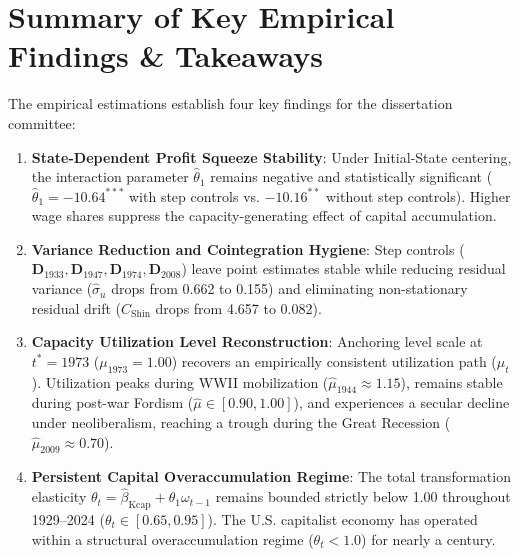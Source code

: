 \documentclass[11pt,a4paper]{article}
\begin{document}








\FloatBarrier
\section{Summary of Key Empirical Findings \& Takeaways}

The empirical estimations establish four key findings for the dissertation committee:

\begin{enumerate}
    \item \textbf{State-Dependent Profit Squeeze Stability}: Under Initial-State centering, the interaction parameter $\hat{\theta}_1$ remains negative and statistically significant ($\hat{\theta}_1 = -10.64^{***}$ with step controls vs. $-10.16^{**}$ without step controls). Higher wage shares suppress the capacity-generating effect of capital accumulation.
    \item \textbf{Variance Reduction and Cointegration Hygiene}: Step controls ($\mathbf{D}_{1933}, \mathbf{D}_{1947}, \mathbf{D}_{1974}, \mathbf{D}_{2008}$) leave point estimates stable while reducing residual variance ($\hat{\sigma}_u$ drops from 0.662 to 0.155) and eliminating non-stationary residual drift ($C_{\text{Shin}}$ drops from 4.657 to 0.082).
    \item \textbf{Capacity Utilization Level Reconstruction}: Anchoring level scale at $t^* = 1973$ ($\mu_{1973} = 1.00$) recovers an empirically consistent utilization path ($\hat{\mu}_t$). Utilization peaks during WWII mobilization ($\hat{\mu}_{1944} \approx 1.15$), remains stable during post-war Fordism ($\hat{\mu} \in [0.90, 1.00]$), and experiences a secular decline under neoliberalism, reaching a trough during the Great Recession ($\hat{\mu}_{2009} \approx 0.70$).
    \item \textbf{Persistent Capital Overaccumulation Regime}: The total transformation elasticity $\theta_t = \hat{\beta}_{\text{Kcap}} + \hat{\theta}_1 \omega_{t-1}$ remains bounded strictly below 1.00 throughout 1929--2024 ($\theta_t \in [0.65, 0.95]$). The U.S. capitalist economy has operated within a structural overaccumulation regime ($\theta_t < 1.0$) for nearly a century.
\end{enumerate}
\end{document}

